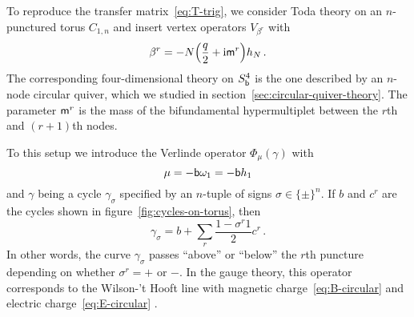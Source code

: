 
To reproduce the transfer matrix~\eqref{eq:T-trig}, we consider Toda
theory on an $n$-punctured torus $C_{1,n}$ and insert vertex operators
$V_{\beta^r}$ with
\begin{equation}
  \beta^r
  = -N\Bigl(\frac{q}{2} + \mathrm{i}\mathsf{m}^r\Bigr) h_N \,.
\end{equation}
The corresponding four-dimensional theory on $S^4_{\mathsf{b}}$ is the one
described by an $n$-node circular quiver, which we studied in
section~\ref{sec:circular-quiver-theory}.  The parameter $\mathsf{m}^r$ is
the mass of the bifundamental hypermultiplet between the $r$th and
$(r+1)$th nodes.

To this setup we introduce the Verlinde operator $\Phi_\mu(\gamma)$
with
\begin{equation}
  \mu = -\mathsf{b}\omega_1 = -\mathsf{b} h_1
\end{equation}
and $\gamma$ being a cycle $\gamma_\sigma$ specified by an $n$-tuple
of signs $\sigma \in \{\pm\}^n$.  If $b$ and $c^r$ are the cycles
shown in figure~\ref{fig:cycles-on-torus}, then
\begin{equation}
  \gamma_\sigma
  =
  b + \sum_r \frac{1 - \sigma^r1}{2} c^r \,.
\end{equation}
In other words, the curve $\gamma_\sigma$ passes ``above'' or
``below'' the $r$th puncture depending on whether $\sigma^r = +$ or
$-$.  In the gauge theory, this operator corresponds to the Wilson-'t
Hooft line with magnetic charge~\eqref{eq:B-circular} and electric
charge~\eqref{eq:E-circular} \cite{Drukker:2009tz}.

